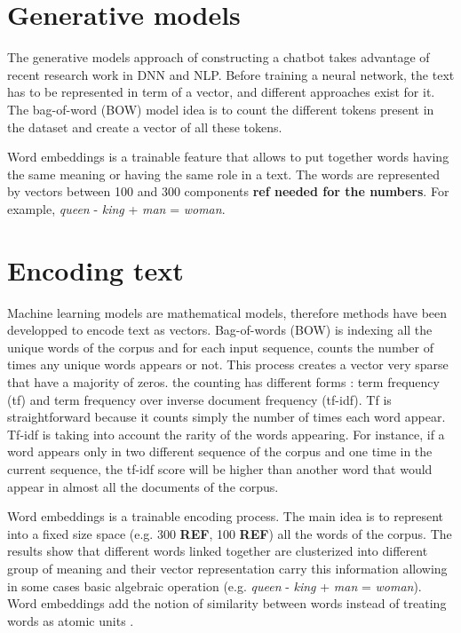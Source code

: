 \section{Generative models}
The generative models approach of constructing a chatbot takes advantage of recent research work in DNN and NLP. Before training a neural network, the text has to be represented in term of a vector, and different approaches exist for it.
The bag-of-word (BOW) model idea is to count the different tokens present in the dataset and create a vector of all these tokens.

Word embeddings is a trainable feature that allows to put together words having the same meaning or having the same role in a text. The words are represented by vectors between 100 and 300 components \textbf{ref needed for the numbers}. For example, \textit{queen} - \textit{king} + \textit{man} = \textit{woman}.


\section{Encoding text}
Machine learning models are mathematical models, therefore methods have been developped to encode text as vectors. Bag-of-words (BOW) is indexing all the unique words of the corpus and for each input sequence, counts the number of times any unique words appears or not. This process creates a vector very sparse that have a majority of zeros. the counting has different forms : term frequency (tf) and term frequency over inverse document frequency (tf-idf). Tf is straightforward because it counts simply the number of times each word appear. Tf-idf is taking into account the rarity of the words appearing. For instance, if a word appears only in two different sequence of the corpus and one time in the current sequence, the tf-idf score will be higher than another word that would appear in almost all the documents of the corpus.

Word embeddings is a trainable encoding process. The main idea is to represent into a fixed size space (e.g. 300 \textbf{REF}, 100 \textbf{REF}) all the words of the corpus. The results show that different words linked together are clusterized into different group of meaning and their vector representation carry this information allowing in some cases basic algebraic operation (e.g. \textit{queen} - \textit{king} + \textit{man} = \textit{woman}). Word embeddings add the notion of similarity between words instead of treating words as atomic units \citep{1301.3781}.

